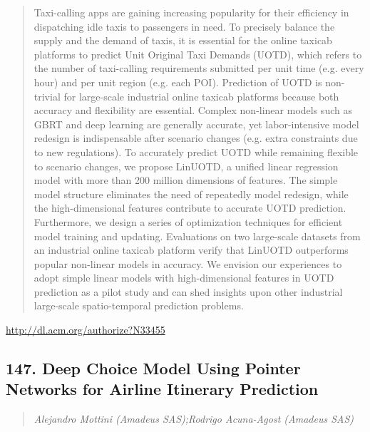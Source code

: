 \documentclass{article}
\begin{document}
\begin{quote}
Taxi-calling apps are gaining increasing popularity for their efficiency in dispatching idle taxis to passengers in need. To precisely balance the supply and the demand of taxis, it is essential for the online taxicab platforms to predict Unit Original Taxi Demands (UOTD), which refers to the number of taxi-calling requirements submitted per unit time (e.g. every hour) and per unit region (e.g. each POI). Prediction of UOTD is non-trivial for large-scale industrial online taxicab platforms because both accuracy and flexibility are essential. Complex non-linear models such as GBRT and deep learning are generally accurate, yet labor-intensive model redesign is indispensable after scenario changes (e.g. extra constraints due to new regulations). To accurately predict UOTD while remaining flexible to scenario changes, we propose LinUOTD, a unified linear regression model with more than 200 million dimensions of features. The simple model structure eliminates the need of repeatedly model redesign, while the high-dimensional features contribute to accurate UOTD prediction. Furthermore, we design a series of optimization techniques for efficient model training and updating. Evaluations on two large-scale datasets from an industrial online taxicab platform verify that LinUOTD outperforms popular non-linear models in accuracy. We envision our experiences to adopt simple linear models with high-dimensional features in UOTD prediction as a pilot study and can shed insights upon other industrial large-scale spatio-temporal prediction problems.
\end{quote}

\href{http://dl.acm.org/authorize?N33455}{http://dl.acm.org/authorize?N33455}

\subsection{147. Deep Choice Model Using Pointer Networks for Airline Itinerary Prediction}

\begin{quote}
\footnotesize{\textit{Alejandro Mottini (Amadeus SAS);Rodrigo Acuna-Agost (Amadeus SAS)}}

\end{quote}
\end{document}
